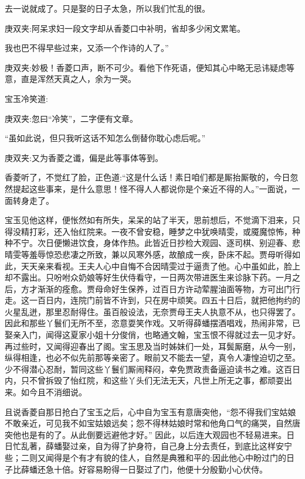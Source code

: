 \begin{parag}
去一说就成了。只是娶的日子太急，所以我们忙乱的很。\begin{note}庚双夹:阿呆求妇一段文字却从香菱口中补明，省却多少闲文累笔。\end{note}我也巴不得早些过来，又添一个作诗的人了。”\begin{note}庚双夹:妙极！香菱口声，断不可少。看他下作死语，便知其心中略无忌讳疑虑等意，直是浑然天真之人，余为一哭。\end{note}宝玉冷笑道:\begin{note}庚双夹:忽曰“冷笑”，二字便有文章。\end{note}“虽如此说，但只我听这话不知怎么倒替你耽心虑后呢。”\begin{note}庚双夹:又为香菱之谶，偏是此等事体等到。\end{note}香菱听了，不觉红了脸，正色道:“这是什么话！素日咱们都是厮抬厮敬的，今日忽然提起这些事来，是什么意思！怪不得人人都说你是个亲近不得的人。”一面说，一面转身走了。
\end{parag}


\begin{parag}
    宝玉见他这样，便怅然如有所失，呆呆的站了半天，思前想后，不觉滴下泪来，只得没精打彩，还入怡红院来。一夜不曾安稳，睡梦之中犹唤晴雯，或魇魔惊怖，种种不宁。次日便懒进饮食，身体作热。此皆近日抄检大观园、逐司棋、别迎春、悲晴雯等羞辱惊恐悲凄之所致，兼以风寒外感，故酿成一疾，卧床不起。贾母听得如此，天天亲来看视。王夫人心中自悔不合因晴雯过于逼责了他。心中虽如此，脸上却不露出。只吩咐众奶娘等好生伏侍看守，一日两次带进医生来诊脉下药。一月之后，方才渐渐的痊愈。贾母命好生保养，过百日方许动荤腥油面等物，方可出门行走。这一百日内，连院门前皆不许到，只在房中顽笑。四五十日后，就把他拘约的火星乱迸，那里忍耐得住。虽百般设法，无奈贾母王夫人执意不从，也只得罢了。因此和那些丫鬟们无所不至，恣意耍笑作戏。又听得薛蟠摆酒唱戏，热闹非常，已娶亲入门，闻得这夏家小姐十分俊俏，也略通文翰，宝玉恨不得就过去一见才好。再过些时，又闻得迎春出了阁。宝玉思及当时姊妹们一处，耳鬓厮磨，从今一别，纵得相逢，也必不似先前那等亲密了。眼前又不能去一望，真令人凄惶迫切之至。少不得潜心忍耐，暂同这些丫鬟们厮闹释闷，幸免贾政责备逼迫读书之难。这百日内，只不曾拆毁了怡红院，和这些丫头们无法无天，凡世上所无之事，都顽耍出来。如今且不消细说。
\end{parag}


\begin{parag}
    且说香菱自那日抢白了宝玉之后，心中自为宝玉有意唐突他，“怨不得我们宝姑娘不敢亲近，可见我不如宝姑娘远矣；怨不得林姑娘时常和他角口气的痛哭，自然唐突他也是有的了。从此倒要远避他才好。” 因此，以后连大观园也不轻易进来。日日忙乱著，薛蟠娶过亲，自为得了护身符，自己身上分去责任，到底比这样安宁些；二则又闻得是个有才有貌的佳人，自然是典雅和平的:因此他心中盼过门的日子比薛蟠还急十倍。好容易盼得一日娶过了门，他便十分殷勤小心伏侍。
\end{parag}


